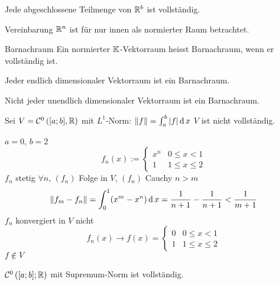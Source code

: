 \begin{Kor}
  Jede abgeschlossene Teilmenge von $\mathbb{R}^b$ ist vollständig.
\end{Kor}
\begin{Bem}{Vereinbarung}
  $\mathbb{R}^n$ ist für nur innen als normierter Raum betrachtet.
\end{Bem}
\begin{Def}{Barnachraum}
  Ein normierter $\mathbb{K}$-Vektorraum heisst Barnachraum, wenn er vollständig ist.
\end{Def}
\begin{Bsp}
  Jeder endlich dimensionaler Vektorraum ist ein Barnachraum.
\end{Bsp}
\begin{Bem}
  Nicht jeder unendlich dimensionaler Vektorraum ist ein Barnachraum.
\end{Bem}
\begin{Bsp}
  Sei $V=\mathcal{C}^0\left( [a;b],\mathbb{R} \right)$ mit $L^1$-Norm: $\left\| f \right\|=\int^b_a\left| f \right|\operatorname{d} x$ $V$ ist nicht vollständig.
\end{Bsp}
\begin{Bsp}
  $a=0$, $b=2$
  \[f_n(x):=\begin{cases}
    x^n&0\leq x<1\\
    1&1\leq x \leq 2
  \end{cases}\]
  $f_n$ stetig $\forall n$, $(f_n)$ Folge in $V$, $(f_n)$ Cauchy $n>m$
  \[\left\| f_m-f_n \right\|=\int^1_0(x^m-x^n)\operatorname{d} x=\frac{1}{n+1}-\frac{1}{n+1}<\frac{1}{m+1}\]
  $f_n$ konvergiert in $V$ nicht
  \[f_n(x)\to f(x) =\begin{cases}
    0&0\leq x<1\\
    1&1\leq x\leq 2
  \end{cases}\]
  $f\not\in V$
\end{Bsp}
\begin{Bsp}
  $\mathcal{C}^0\left( [a;b];\mathbb{R} \right)$ mit Supremum-Norm ist vollständig.
\end{Bsp}
